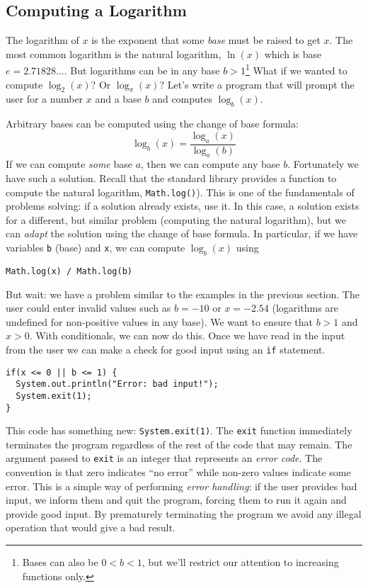 \subsection{Computing a Logarithm}

The logarithm of $x$ is the exponent that some \emph{base} must 
be raised to get $x$.  The most common logarithm is the natural logarithm, 
$\ln{(x)}$ which is base $e = 2.71828\ldots$.  But logarithms can be in any base 
$b > 1$\footnote{Bases can also be $0< b < 1$, but we'll restrict our attention to
increasing functions only.}  What if we wanted to compute $\log_2{(x)}$?  
Or $\log_{\pi}{(x)}$?  Let's write a program that will prompt the user for a
number $x$ and a base $b$ and computes $\log_b{(x)}$.

Arbitrary bases can be computed using the change of base formula: 
  $$\log_b(x) = \frac{\log_a{(x)}}{\log_a{(b)}}$$
If we can compute \emph{some} base $a$, then we can compute any base 
$b$.  Fortunately we have such a solution.  Recall that the standard library 
provides a function to compute the natural logarithm, \texttt{Math.log()}).
This is one of the fundamentals of problems solving: if a solution already 
exists, use it.  In this case, a solution exists for a different, but similar problem
(computing the natural logarithm), but we can \emph{adapt} the solution 
using the change of base formula.  In particular, if we have variables 
\texttt{b} (base) and \texttt{x}, we can compute $\log_b{(x)}$ using

  \texttt{Math.log(x) / Math.log(b)}
  
But wait: we have a problem similar to the examples in the previous section.  
The user could enter invalid values such as $b = -10$ or $x = -2.54$ 
(logarithms are undefined for non-positive values in any base).  We want
to ensure that $b > 1$ and $x > 0$.  With conditionals, we can now do this.  
Once we have read in the input from the user we can make a check for
good input using an \texttt{if} statement.

\begin{verbatim}
if(x <= 0 || b <= 1) {
  System.out.println("Error: bad input!");
  System.exit(1);
}
\end{verbatim}

This code has something new: \texttt{System.exit(1)}.  The \texttt{exit}
function immediately terminates the program regardless of the rest of the
code that may remain.  The argument passed to \texttt{exit} is an 
integer that represents an \emph{error code}.  The convention is that 
zero indicates ``no error'' while non-zero values indicate some error.  This
is a simple way of performing \emph{error handling}: if the user provides
bad input, we inform them and quit the program, forcing them to run it
again and provide good input.  By prematurely terminating the program
we avoid any illegal operation that would give a bad result.

